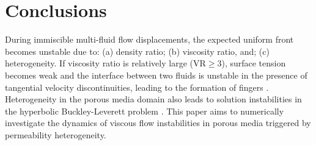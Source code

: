 \documentclass[preprint,authoryear,12pt]{elsarticle}
\newcommand{\ie}{{\it i.e., }}
\begin{document}


\section{Conclusions}\label{Section:Conclusion}
During immiscible multi-fluid flow displacements, the expected uniform front becomes unstable due to: (a) density ratio; (b) viscosity ratio, and; (c) heterogeneity. If viscosity ratio is relatively large (VR$\ge$3), surface tension becomes weak and the interface between two fluids is unstable in the presence of tangential velocity discontinuities, leading to the formation of fingers \citep{saffman_1986}. Heterogeneity in the porous media domain  also leads to solution instabilities in the hyperbolic Buckley-Leverett problem \citep{langtangen_1992}. This paper aims to numerically investigate the dynamics of viscous flow instabilities in porous media triggered by permeability heterogeneity. 
\end{document}
